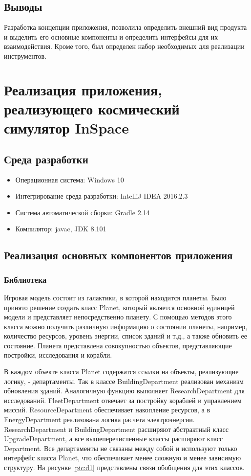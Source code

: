 \subsection{Выводы} 
Разработка концепции приложения, позволила определить внешний вид продукта и выделить его основные компоненты и определить интерфейсы для их взаимодействия. Кроме того, был определен набор необходимых для реализации инструментов.

\section{Реализация приложения, реализующего космический симулятор InSpace}

\subsection{Среда разработки}

\begin{itemize}
	\item Операционная система: Windows 10
	\item Интегрирование среда разработки: IntelliJ IDEA 2016.2.3
	\item Система автоматической сборки: Gradle 2.14
	\item Компилятор: javac, JDK 8.101
\end{itemize}

\subsection{Реализация основных компонентов приложения}

\subsubsection{Библиотека}

Игровая модель состоит из галактики, в которой находится планеты. Было принято решение создать класс Planet, который является основной единицей модели и представляет непосредственно планету. С помощью методов этого класса можно получить различную информацию о состоянии планеты, например, количество ресурсов, уровень энергии, список зданий и т.д., а также обновить ее состояние. Планета представлена совокупностью объектов, представляющие постройки, исследования и корабли.

В каждом объекте класса Planet содержатся ссылки на объекты, реализующие логику, - департаменты. Так в классе BuildingDepartment реализован механизм обновления зданий. Аналогичную функцию выполняет ResearchDepartment для исследований. FleetDepartment отвечает за постройку кораблей и управлением миссий. ResourceDepartment обеспечивает накопление ресурсов, а в EnergyDepartment  реализована логика расчета электроэнергии. ResearchDepartment и BuildingDepartment расширяют абстрактный класс UpgradeDepartment, а все вышеперечисленные классы расширяют класс Department. Все департаменты не связаны между собой и используют только интерфейс класса Planet, что обеспечивает менее сложную и менее зависимую структуру. На рисунке \ref{pic:d1} представлены связи обобщения для этих классов.

